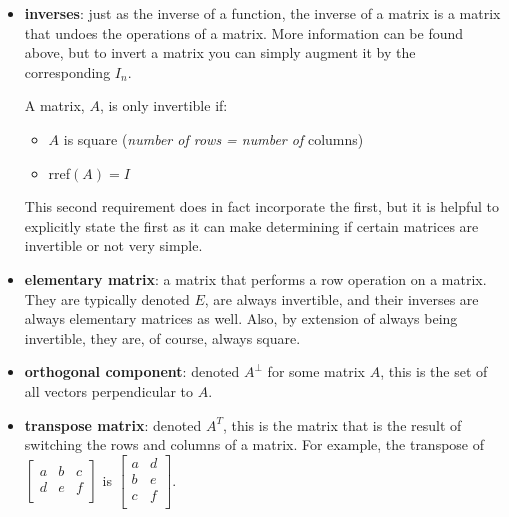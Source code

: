 \documentclass[12pt]{article}
\begin{document}
{{\begin{itemize}
        Note that "$\circ$" is read as "$T$ composed with $S$".

        Its important to note that it is \textit{not necessarily true} that $S \circ T = T \circ S$.

        \item \textbf{inverses}: just as the inverse of a function, the inverse of a matrix is a matrix that undoes the operations of a matrix. More information can be found above, but to invert a matrix you can simply augment it by the corresponding $I_n$.
        
        A matrix, $A$, is only invertible if:

        \begin{itemize}
            \item $A$ is square (\textit{number of rows = number of} columns)
            \item rref$(A) = I$
        \end{itemize}

        This second requirement does in fact incorporate the first, but it is helpful to explicitly state the first as it can make determining if certain matrices are invertible or not very simple.

        \item \textbf{elementary matrix}: a matrix that performs a row operation on a matrix. They are typically denoted $E$, are always invertible, and their inverses are always elementary matrices as well. Also, by extension of always being invertible, they are, of course, always square.
        
        \item \textbf{orthogonal component}: denoted $A^\bot$ for some matrix $A$, this is the set of all vectors perpendicular to $A$.
        
        \item \textbf{transpose matrix}: denoted $A^T$, this is the matrix that is the result of switching the rows and columns of a matrix. For example, the transpose of $\begin{bmatrix}
            a & b & c\\
            d & e & f\\
        \end{bmatrix}$ is $\begin{bmatrix}
            a & d\\
            b & e\\
            c & f\\
        \end{bmatrix}$.


\end{itemize}}}
\end{document}

